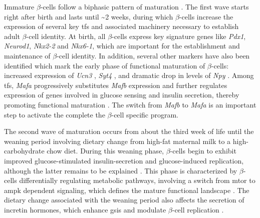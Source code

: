 \par Immature $\beta$-cells follow a biphasic pattern of maturation \textbf{\cite{salinno_-cell_2019, stolovich-rain_weaning_2015}}. The first wave starts right after birth and lasts until \textasciitilde 2 weeks, during which $\beta$-cells increase the expression of several key \glspl{tf} and associated machinery necessary to establish adult $\beta$-cell identity. At birth, all $\beta$-cells express key signature genes like \textit{Pdx1}, \textit{Neurod1}, \textit{Nkx2-2} and \textit{Nkx6-1}, which are important for the establishment and maintenance of $\beta$-cell identity. In addition, several other markers have also been identified which mark the early phase of functional maturation of $\beta$-cells: increased expression of \textit{Ucn3} \textbf{\cite{salinno_-cell_2019, blum_functional_2012}}, \textit{Syt4} \textbf{\cite{salinno_-cell_2019, huang_synaptotagmin_2018}},  \textbf{\cite{salinno_-cell_2019, bader_identification_2016}}  and dramatic drop in levels of \textit{Npy} \textbf{\cite{salinno_-cell_2019, rodnoi_neuropeptide_2017}}. Among \glspl{tf}, \textit{Mafa} progressively substitutes \textit{Mafb} expression and further regulates expression of genes involved in glucose sensing and insulin secretion, thereby promoting functional maturation \textbf{\cite{salinno_-cell_2019}}. The switch from \textit{Mafb} to \textit{Mafa} is an important step to activate the complete the $\beta$-cell specific program.\\

\par The second wave of maturation occurs from about the third week of life until the weaning period involving dietary change from high-fat maternal milk to a high-carbohydrate chow diet. During this weaning phase, $\beta$-cells begin to exhibit improved glucose-stimulated insulin-secretion and glucose-induced replication, although the latter remains to be explained \textbf{\cite{salinno_-cell_2019,stolovich-rain_weaning_2015}}. This phase is characterized by $\beta$-cells differentially regulating metabolic pathways, involving a switch from \gls{mtor} to \gls{ampk} dependent signaling, which defines the mature functional landscape \textbf{\cite{salinno_-cell_2019,jaafar_mtorc1_2019}}. The dietary change associated with the weaning period also affects the secretion of incretin hormones, which enhance \gls{gsis} and modulate $\beta$-cell replication \textbf{\cite{campbell_pharmacology_2013}}.






